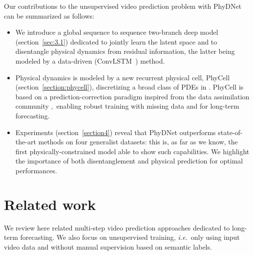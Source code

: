\documentclass[10pt,twocolumn,letterpaper]{article}
\def\ie{\textit{i.e.}~}
\begin{document}
Our contributions to the unsupervised video prediction problem with PhyDNet can be summarized as follows: 
\begin{itemize}
\item We introduce a global sequence to sequence two-branch deep model (section~\ref{sec:3.1}) dedicated to jointly learn the latent space  and to disentangle physical dynamics from residual information, the latter being modeled by a data-driven (ConvLSTM~\cite{xingjian2015convolutional}) method. \vspace{-0.05cm}

\item Physical dynamics is modeled by a new recurrent physical cell, PhyCell (section~\ref{section:phycell}), discretizing a broad class of PDEs in . PhyCell is based on a prediction-correction paradigm inspired from the data assimilation community \cite{asch2016data},~enabling robust training with missing data and for long-term forecasting. \vspace{-0.05cm}

\item Experiments (section~\ref{section4}) reveal that PhyDNet outperforms state-of-the-art methods on four generalist datasets: this is, as far as we know, the first physically-constrained model able to show such capabilities. We highlight the importance of both disentanglement and physical prediction for optimal performances.

\end{itemize}

\section{Related work}
\label{sec:sota}

We review here related multi-step video prediction approaches dedicated to long-term forecasting. We also focus on unsupervised training, \ie only using input video data and without manual supervision based on semantic labels. \vspace{-0.2cm}
\end{document}
